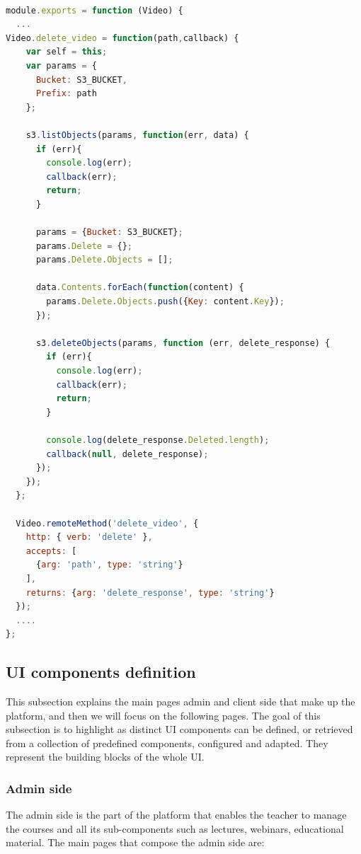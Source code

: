 \begin{lstlisting}[language=javascript]

module.exports = function (Video) {
  ...
Video.delete_video = function(path,callback) {
    var self = this;
    var params = {
      Bucket: S3_BUCKET,
      Prefix: path
    };

    s3.listObjects(params, function(err, data) {
      if (err){
        console.log(err);
        callback(err);
        return;
      } 

      params = {Bucket: S3_BUCKET};
      params.Delete = {};
      params.Delete.Objects = [];

      data.Contents.forEach(function(content) {
        params.Delete.Objects.push({Key: content.Key});
      });

      s3.deleteObjects(params, function (err, delete_response) {
        if (err){
          console.log(err);
          callback(err);
          return;
        }

        console.log(delete_response.Deleted.length);
        callback(null, delete_response);
      });
    });
  };

  Video.remoteMethod('delete_video', {
    http: { verb: 'delete' },
    accepts: [
      {arg: 'path', type: 'string'}
    ],
    returns: {arg: 'delete_response', type: 'string'}
  });
  ....
};
\end{lstlisting}

\subsection {UI components definition}
\label{subsec:components_definition}
This subsection explains the main pages admin and client side that make up the platform, and then we will focus on the following pages.
The goal of this subsection is to highlight as distinct UI components can be defined, or retrieved from a collection of predefined components, configured and adapted. They represent the building blocks of the whole UI.


\subsubsection {Admin side}
\label{subsec:Admin_side}
The admin side is the part of the platform that enables the teacher to manage the courses and all its sub-components such as lectures, webinars, educational material.
The main pages that compose the admin side are:

